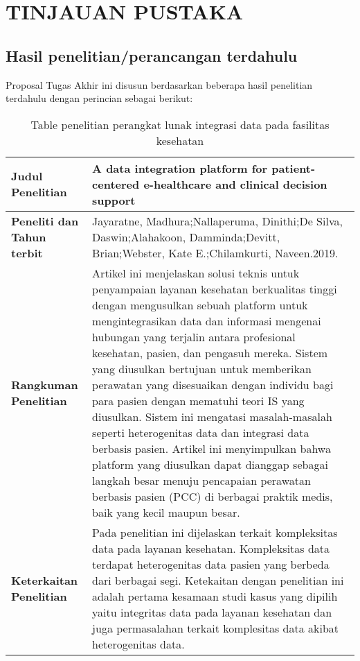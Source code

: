 \chapter{TINJAUAN PUSTAKA}

\section{Hasil penelitian/perancangan terdahulu}
Proposal Tugas Akhir ini disusun berdasarkan beberapa hasil penelitian terdahulu dengan perincian sebagai berikut:
\renewcommand\tabularxcolumn[1]{m{#1}}
\begin{table}[ht]
  \caption{Table penelitian perangkat lunak integrasi data pada fasilitas kesehatan}
  \label{tab:penelitian-terdahulu}
  \centering
  \begin{tabularx}{\textwidth}{|p{3.5cm}|X|}
    \hline
    \textbf{Judul Penelitian} & A data integration platform for patient-centered e-healthcare and clinical decision support \\
    \hline
    \textbf{Peneliti dan Tahun terbit} & Jayaratne, Madhura;Nallaperuma, Dinithi;De Silva, Daswin;Alahakoon, Damminda;Devitt, Brian;Webster, Kate E.;Chilamkurti, Naveen.2019. \\
    \hline
    \textbf{Rangkuman Penelitian} & Artikel ini menjelaskan solusi teknis untuk penyampaian layanan kesehatan berkualitas tinggi dengan mengusulkan sebuah platform untuk mengintegrasikan data dan informasi mengenai hubungan yang terjalin antara profesional kesehatan, pasien, dan pengasuh mereka. Sistem yang diusulkan bertujuan untuk memberikan perawatan yang disesuaikan dengan individu bagi para pasien dengan mematuhi teori IS yang diusulkan. Sistem ini mengatasi masalah-masalah seperti heterogenitas data dan integrasi data berbasis pasien. Artikel ini menyimpulkan bahwa platform yang diusulkan dapat dianggap sebagai langkah besar menuju pencapaian perawatan berbasis pasien (PCC) di berbagai praktik medis, baik yang kecil maupun besar.\\
    \hline
    \textbf{Keterkaitan Penelitian} & Pada penelitian ini dijelaskan terkait kompleksitas data pada layanan kesehatan. Kompleksitas data terdapat heterogenitas data pasien yang berbeda dari berbagai segi. Ketekaitan dengan penelitian ini adalah pertama kesamaan studi kasus yang dipilih yaitu integritas data pada layanan kesehatan dan juga permasalahan terkait komplesitas data akibat heterogenitas data. \\
    \hline
  \end{tabularx}
\end{table}

